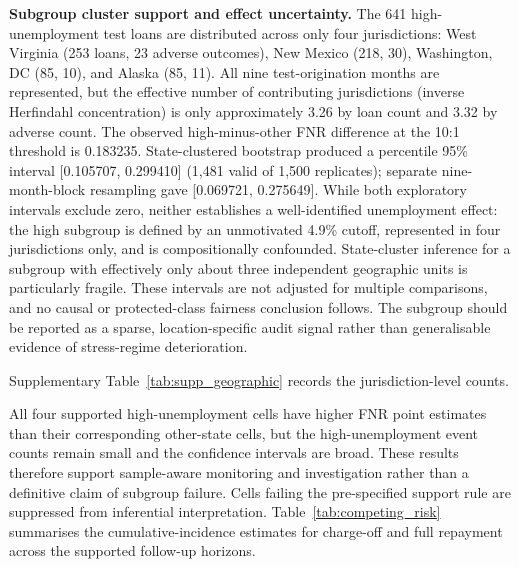 \documentclass[10pt]{article}
\begin{document}
\noindent\textbf{Subgroup cluster support and effect uncertainty.} The 641 high-unemployment test loans are distributed across only four jurisdictions: West Virginia (253 loans, 23 adverse outcomes), New Mexico (218, 30), Washington, DC (85, 10), and Alaska (85, 11). All nine test-origination months are represented, but the effective number of contributing jurisdictions (inverse Herfindahl concentration) is only approximately 3.26 by loan count and 3.32 by adverse count. The observed high-minus-other FNR difference at the 10:1 threshold is 0.183235. State-clustered bootstrap produced a percentile 95\% interval [0.105707, 0.299410] (1,481 valid of 1,500 replicates); separate nine-month-block resampling gave [0.069721, 0.275649]. While both exploratory intervals exclude zero, neither establishes a well-identified unemployment effect: the high subgroup is defined by an unmotivated 4.9\% cutoff, represented in four jurisdictions only, and is compositionally confounded. State-cluster inference for a subgroup with effectively only about three independent geographic units is particularly fragile. These intervals are not adjusted for multiple comparisons, and no causal or protected-class fairness conclusion follows. The subgroup should be reported as a sparse, location-specific audit signal rather than generalisable evidence of stress-regime deterioration.

Supplementary Table~\ref{tab:supp_geographic} records the jurisdiction-level counts.


All four supported high-unemployment cells have higher FNR point estimates than their corresponding other-state cells, but the high-unemployment event counts remain small and the confidence intervals are broad. These results therefore support sample-aware monitoring and investigation rather than a definitive claim of subgroup failure. Cells failing the pre-specified support rule are suppressed from inferential interpretation. Table~\ref{tab:competing_risk} summarises the cumulative-incidence estimates for charge-off and full repayment across the supported follow-up horizons.
\end{document}
